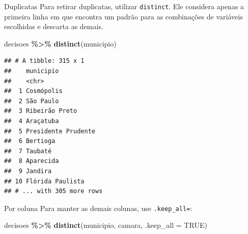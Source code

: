\documentclass[
  10pt,
  ignorenonframetext,
]{beamer}
\newenvironment{Shaded}{\begin{snugshade}}{\end{snugshade}}
\newcommand{\DataTypeTok}[1]{\textcolor[rgb]{0.13,0.29,0.53}{#1}}
\newcommand{\KeywordTok}[1]{\textcolor[rgb]{0.13,0.29,0.53}{\textbf{#1}}}
\newcommand{\NormalTok}[1]{#1}
\newcommand{\OperatorTok}[1]{\textcolor[rgb]{0.81,0.36,0.00}{\textbf{#1}}}
\newcommand{\OtherTok}[1]{\textcolor[rgb]{0.56,0.35,0.01}{#1}}
\newcommand{\StringTok}[1]{\textcolor[rgb]{0.31,0.60,0.02}{#1}}
\begin{document}
\begin{frame}[fragile]{Duplicatas}
\protect\hypertarget{duplicatas-1}{}
Para retirar duplicatas, utilizar \texttt{distinct}. Ele considera
apenas a primeira linha em que encontra um padrão para as combinações de
variáveis escolhidas e descarta as demais.

\begin{Shaded}
\begin{Highlighting}[]
\NormalTok{decisoes }\OperatorTok{\%\textgreater{}\%}\StringTok{ }
\StringTok{  }\KeywordTok{distinct}\NormalTok{(municipio)}
\end{Highlighting}
\end{Shaded}
\end{frame}

\begin{frame}[fragile]{}
\protect\hypertarget{section-7}{}
\begin{verbatim}
## # A tibble: 315 x 1
##    municipio          
##    <chr>              
##  1 Cosmópolis         
##  2 São Paulo          
##  3 Ribeirão Preto     
##  4 Araçatuba          
##  5 Presidente Prudente
##  6 Bertioga           
##  7 Taubaté            
##  8 Aparecida          
##  9 Jandira            
## 10 Flórida Paulista   
## # ... with 305 more rows
\end{verbatim}
\end{frame}

\begin{frame}[fragile]{Por coluna}
\protect\hypertarget{por-coluna-1}{}
Para manter as demais colunas, use \texttt{.keep\_all=}:

\begin{Shaded}
\begin{Highlighting}[]
\NormalTok{decisoes }\OperatorTok{\%\textgreater{}\%}
\StringTok{  }\KeywordTok{distinct}\NormalTok{(municipio, camara, }
           \DataTypeTok{.keep\_all =} \OtherTok{TRUE}\NormalTok{)}
\end{Highlighting}
\end{Shaded}
\end{frame}
\end{document}
